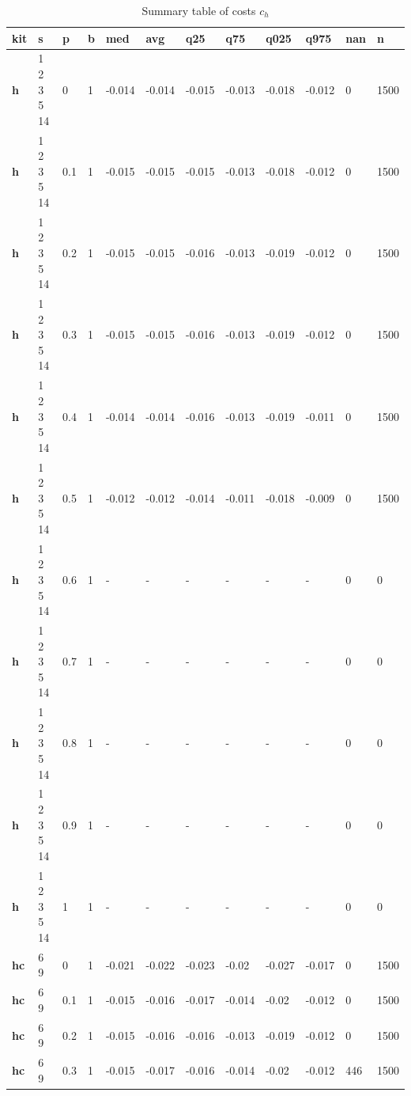 \begin{table}[h]
 \centering 
\footnotesize
\caption{Summary table of costs $c_h$}
\label{tab:costs_mod_h}
\begin{tabular}[h]{|l|l|l|l|l|l|l|l|l|l|l|l|
    } \hline
\textbf{ kit} & \textbf{ s} & \textbf{ p} & \textbf{ b} & \textbf{ med} & \textbf{ avg} & \textbf{ q25} & \textbf{ q75} & \textbf{ q025} & \textbf{ q975} & \textbf{ nan} & \textbf{ n}
    \\ \hline
  \textbf{h   } & 1 2 3 5 14 &   0 & 1 & -0.014 & -0.014 & -0.015 & -0.013 & -0.018 & -0.012 &    0 & 1500
    \\ \hline
  \textbf{h   } & 1 2 3 5 14 & 0.1 & 1 & -0.015 & -0.015 & -0.015 & -0.013 & -0.018 & -0.012 &    0 & 1500
    \\ \hline
  \textbf{h   } & 1 2 3 5 14 & 0.2 & 1 & -0.015 & -0.015 & -0.016 & -0.013 & -0.019 & -0.012 &    0 & 1500
    \\ \hline
  \textbf{h   } & 1 2 3 5 14 & 0.3 & 1 & -0.015 & -0.015 & -0.016 & -0.013 & -0.019 & -0.012 &    0 & 1500
    \\ \hline
  \textbf{h   } & 1 2 3 5 14 & 0.4 & 1 & -0.014 & -0.014 & -0.016 & -0.013 & -0.019 & -0.011 &    0 & 1500
    \\ \hline
  \textbf{h   } & 1 2 3 5 14 & 0.5 & 1 & -0.012 & -0.012 & -0.014 & -0.011 & -0.018 & -0.009 &    0 & 1500
    \\ \hline
  \textbf{h   } & 1 2 3 5 14 & 0.6 & 1 & - & - & - & - & - & - &    0 &    0
    \\ \hline
  \textbf{h   } & 1 2 3 5 14 & 0.7 & 1 & - & - & - & - & - & - &    0 &    0
    \\ \hline
  \textbf{h   } & 1 2 3 5 14 & 0.8 & 1 & - & - & - & - & - & - &    0 &    0
    \\ \hline
  \textbf{h   } & 1 2 3 5 14 & 0.9 & 1 & - & - & - & - & - & - &    0 &    0
    \\ \hline
  \textbf{h   } & 1 2 3 5 14 &   1 & 1 & - & - & - & - & - & - &    0 &    0
    \\ \hline
  \textbf{hc  } & 6 9        &   0 & 1 & -0.021 & -0.022 & -0.023 &  -0.02 & -0.027 & -0.017 &    0 & 1500
    \\ \hline
  \textbf{hc  } & 6 9        & 0.1 & 1 & -0.015 & -0.016 & -0.017 & -0.014 &  -0.02 & -0.012 &    0 & 1500
    \\ \hline
  \textbf{hc  } & 6 9        & 0.2 & 1 & -0.015 & -0.016 & -0.016 & -0.013 & -0.019 & -0.012 &    0 & 1500
    \\ \hline
  \textbf{hc  } & 6 9        & 0.3 & 1 & -0.015 & -0.017 & -0.016 & -0.014 &  -0.02 & -0.012 &  446 & 1500

\end{tabular}
\end{table}
